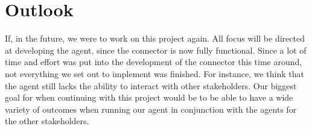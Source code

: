 \chapter{Outlook}
\label{chap:Outlook}

If, in the future, we were to work on this project again. All focus will be directed at developing the agent, since the connector is now fully functional.
Since a lot of time and effort was put into the development of the connector this time around, not everything we set out to implement was finished.
For instance, we think that the agent still lacks the ability to interact with other stakeholders.
Our biggest goal for when continuing with this project would be to be able to have a wide variety of outcomes when running our agent in conjunction with the agents for the other stakeholders.

\newpage
